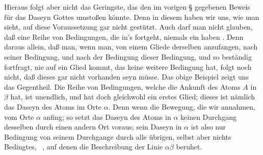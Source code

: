 \begin{aufza}
\item Hieraus folgt aber nicht das Geringste, das den im vorigen § gegebenen Beweis für das Daseyn Gottes umstoßen könnte. Denn in diesem haben wir uns, wie man sieht, auf diese Voraussetzung gar nicht gestützt. Auch darf man nicht glauben, daß eine Reihe von Bedingungen, die in's  fortgeht, niemals ein  haben . Denn daraus allein, daß man, wenn man, von einem Gliede derselben anzufangen, nach seiner Bedingung, und nach der Bedingung dieser Bedingung, und so beständig fortfragt, nie auf ein Glied kommt, das keine weitere Bedingung hat, folgt noch nicht, daß dieses gar nicht vorhanden seyn müsse. Das obige Beispiel zeigt uns das Gegentheil. Die Reihe von Bedingungen, welche die Ankunft des Atoms $A$ in $\beta$ hat, ist unendlich, und hat doch gleichwohl ein erstes Glied; dieses ist nämlich das Daseyn des Atoms im Orte $\alpha$. Denn wenn die Bewegung, die wir annahmen, vom Orte $\alpha$ anfing; so setzt das Daseyn des Atoms in $\alpha$ keinen Durchgang desselben durch einen andern Ort voraus; sein Daseyn in $\alpha$ ist also nur Bedingung von seinem Durchgange durch alle übrigen, selbst aber nichts Bedingtes, \dh\ , auf denen die Beschreibung der Linie $\alpha\beta$ beruhet.
\end{aufza}

